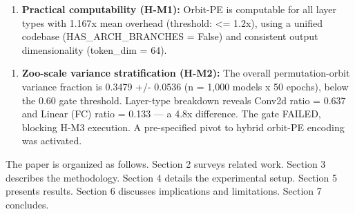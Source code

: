 \begin{enumerate}
\item \textbf{Practical computability (H-M1):} Orbit-PE is computable for all layer types with 1.167x mean overhead (threshold: <= 1.2x), using a unified codebase (HAS_ARCH_BRANCHES = False) and consistent output dimensionality (token_dim = 64).
\end{enumerate}

\begin{enumerate}
\item \textbf{Zoo-scale variance stratification (H-M2):} The overall permutation-orbit variance fraction is 0.3479 +/- 0.0536 (n = 1,000 models x 50 epochs), below the 0.60 gate threshold. Layer-type breakdown reveals Conv2d ratio = 0.637 and Linear (FC) ratio = 0.133 — a 4.8x difference. The gate FAILED, blocking H-M3 execution. A pre-specified pivot to hybrid orbit-PE encoding was activated.
\end{enumerate}

The paper is organized as follows. Section 2 surveys related work. Section 3 describes the methodology. Section 4 details the experimental setup. Section 5 presents results. Section 6 discusses implications and limitations. Section 7 concludes.

